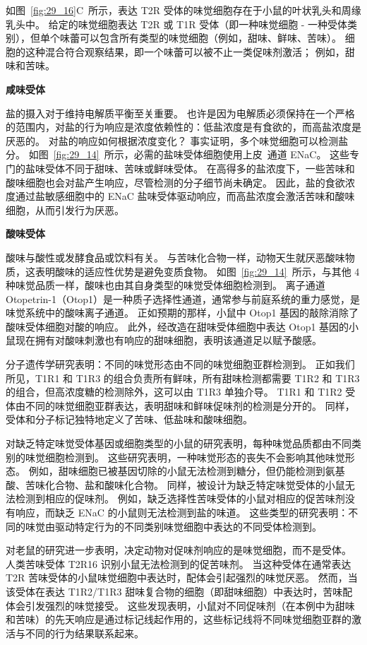 如图~\ref{fig:29_16}C~所示，表达 T2R 受体的味觉细胞存在于小鼠的叶状乳头和周缘乳头中。
给定的味觉细胞表达 T2R 或 T1R 受体（即一种味觉细胞 - 一种受体类别），但单个味蕾可以包含所有类型的味觉细胞（例如，甜味、鲜味、苦味）。
细胞的这种混合符合观察结果，即一个味蕾可以被不止一类促味剂激活； 例如，甜味和苦味。



\textbf{咸味受体}

盐的摄入对于维持电解质平衡至关重要。
也许是因为电解质必须保持在一个严格的范围内，对盐的行为响应是浓度依赖性的：低盐浓度是有食欲的，而高盐浓度是厌恶的。
对盐的响应如何根据浓度变化？
事实证明，多个味觉细胞可以检测盐分。
如图~\ref{fig:29_14}~所示，必需的盐味受体细胞使用上皮~通道 ENaC。
这些专门的盐味受体不同于甜味、苦味或鲜味受体。
在高得多的盐浓度下，一些苦味和酸味细胞也会对盐产生响应，尽管检测的分子细节尚未确定。
因此，盐的食欲浓度通过盐敏感细胞中的 ENaC 盐味受体驱动响应，而高盐浓度会激活苦味和酸味细胞，从而引发行为厌恶。



\textbf{酸味受体}

酸味与酸性或发酵食品或饮料有关。
与苦味化合物一样，动物天生就厌恶酸味物质，这表明酸味的适应性优势是避免变质食物。
如图~\ref{fig:29_14}~所示，与其他 4 种味觉品质一样，酸味也由其自身类型的味觉受体细胞检测到。
离子通道 Otopetrin-1（Otop1）是一种质子选择性通道，通常参与前庭系统的重力感觉，是味觉系统中的酸味离子通道。
正如预期的那样，小鼠中 Otop1 基因的敲除消除了酸味受体细胞对酸的响应。
此外，经改造在甜味受体细胞中表达 Otop1 基因的小鼠现在拥有对酸味刺激也有响应的甜味细胞，表明该通道足以赋予酸感。


分子遗传学研究表明：不同的味觉形态由不同的味觉细胞亚群检测到。
正如我们所见，T1R1 和 T1R3 的组合负责所有鲜味，所有甜味检测都需要 T1R2 和 T1R3 的组合，但高浓度糖的检测除外，这可以由 T1R3 单独介导。
T1R1 和 T1R2 受体由不同的味觉细胞亚群表达，表明甜味和鲜味促味剂的检测是分开的。
同样，受体和分子标记独特地定义了苦味、低盐味和酸味细胞。


对缺乏特定味觉受体基因或细胞类型的小鼠的研究表明，每种味觉品质都由不同类别的味觉细胞检测到。
这些研究表明，一种味觉形态的丧失不会影响其他味觉形态。
例如，甜味细胞已被基因切除的小鼠无法检测到糖分，但仍能检测到氨基酸、苦味化合物、盐和酸味化合物。
同样，被设计为缺乏特定味觉受体的小鼠无法检测到相应的促味剂。
例如，缺乏选择性苦味受体的小鼠对相应的促苦味剂没有响应，而缺乏 ENaC 的小鼠则无法检测到盐的味道。
这些类型的研究表明：不同的味觉由驱动特定行为的不同类别味觉细胞中表达的不同受体检测到。


对老鼠的研究进一步表明，决定动物对促味剂响应的是味觉细胞，而不是受体。
人类苦味受体 T2R16 识别小鼠无法检测到的促苦味剂。
当这种受体在通常表达 T2R 苦味受体的小鼠味觉细胞中表达时，配体会引起强烈的味觉厌恶。
然而，当该受体在表达 T1R2/T1R3 甜味复合物的细胞（即甜味细胞）中表达时，苦味配体会引发强烈的味觉接受。
这些发现表明，小鼠对不同促味剂（在本例中为甜味和苦味）的先天响应是通过标记线起作用的，这些标记线将不同味觉细胞亚群的激活与不同的行为结果联系起来。



